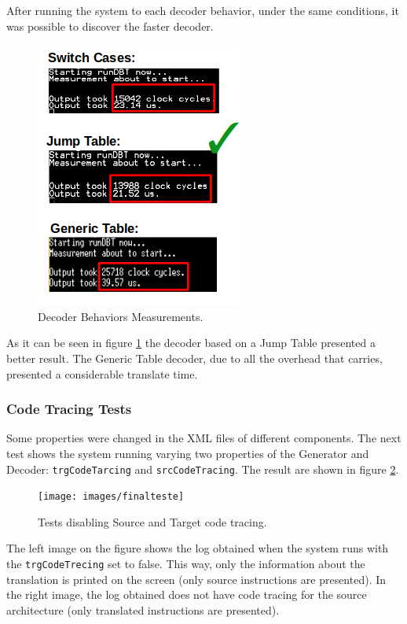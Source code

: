 After running the system to each decoder behavior, under the same conditions, it was possible to discover the faster decoder.

\begin{figure}[H]
\centerline{
\includegraphics[scale=0.67]{images/DecoderBehaviorsResults}
}
\caption{Decoder Behaviors Measurements.}
\label{fig:DecoderBehaviorsMeasurements}
\end{figure}

As it can be seen in figure \ref{fig:DecoderBehaviorsMeasurements} the decoder based on a Jump Table presented a better result. The Generic Table decoder, due to all the overhead that carries, presented a considerable translate time.

\subsubsection{Code Tracing Tests}

Some properties were changed in the XML files of different components. The next test shows the system running varying two properties of the Generator and Decoder: \texttt{trgCodeTarcing} and \texttt{srcCodeTracing}. The result are shown in figure \ref{fig:finalteste}.

\begin{figure}[H]
\centerline{
\texttt{[image: images/finalteste]}
}
\caption{Tests disabling Source and Target code tracing.}
\label{fig:finalteste}
\end{figure}


The left image on the figure shows the log obtained when the system runs with the \texttt{trgCodeTrecing} set to false. This way, only the information about the translation is printed on the screen (only source instructions are presented). In the right image, the log obtained does not have code tracing for the source architecture (only translated instructions are presented). \\

